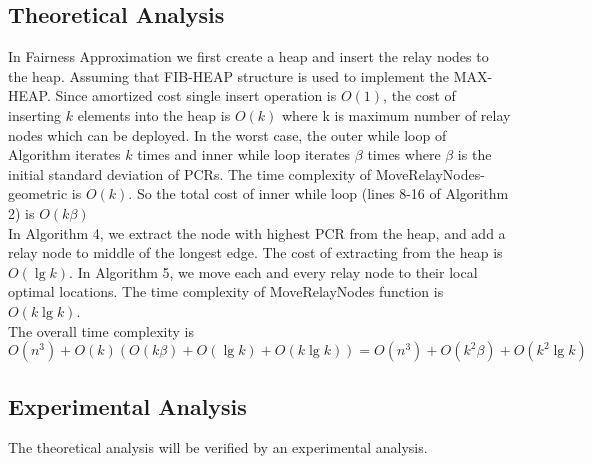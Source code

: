 \subsection{Theoretical Analysis}

In Fairness Approximation we first create a heap and insert the relay nodes to the heap. Assuming that FIB-HEAP structure is used to implement the MAX-HEAP. Since amortized cost single insert operation is $O(1)$, the cost of inserting $k$ elements into the heap is $O(k)$ where k is maximum number of relay nodes which can be deployed. In the worst case, the outer while loop of Algorithm iterates $k$ times and inner while loop iterates $\beta$ times where $\beta$ is the initial standard deviation of PCRs. The time complexity of MoveRelayNodes-geometric is $O(k)$. So the total cost of inner while loop (lines 8-16 of Algorithm 2) is $O(k\beta)$ \\

In Algorithm 4, we extract the node with highest PCR from the heap, and add a relay node to middle of the longest edge. The cost of extracting from the heap is $O(\lg k)$. In Algorithm 5, we move each and every relay node to their local optimal locations. The time complexity of MoveRelayNodes function is $O(k \lg k)$.\\

The overall time complexity is $O(n^{3})+O(k)(O(k\beta)+O(\lg k)+O(k \lg k))=O(n^3)+O(k^{2}\beta)+O(k^{2} \lg k)$

\subsection{Experimental Analysis}
The theoretical analysis will be verified by an experimental analysis.


